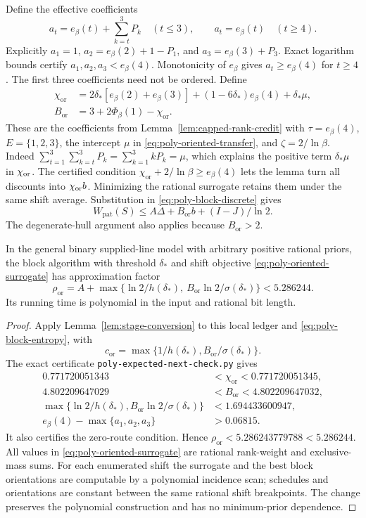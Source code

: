 Define the effective coefficients
\[
 a_t=e_\beta(t)+\sum_{k=t}^{3}P_k\quad(t\le3),\qquad
 a_t=e_\beta(t)\quad(t\ge4).
\]
Explicitly $a_1=1$, $a_2=e_\beta(2)+1-P_1$, and
$a_3=e_\beta(3)+P_3$. Exact logarithm bounds certify
$a_1,a_2,a_3<e_\beta(4)$. Monotonicity of $e_\beta$ gives
$a_t\ge e_\beta(4)$ for $t\ge4$. The first three coefficients need not be ordered. Define
\[
 \begin{aligned}
 \chi_{\mathrm{or}}
 &=2\delta_*[e_\beta(2)+e_\beta(3)]
       +(1-6\delta_*)e_\beta(4)+\delta_*\mu,\\
 B_{\mathrm{or}}&=3+2\Phi_\beta(1)-\chi_{\mathrm{or}}.
 \end{aligned}
\]
These are the coefficients from Lemma~\ref{lem:capped-rank-credit}
with $\tau=e_\beta(4)$, $E=\{1,2,3\}$, the intercept $\mu$ in
\eqref{eq:poly-oriented-transfer}, and $\zeta=2/\ln\beta$.
Indeed $\sum_{t=1}^3\sum_{k=t}^3P_k=\sum_{k=1}^3kP_k=\mu$,
which explains the positive term $\delta_*\mu$ in $\chi_{\rm or}$.
The certified condition
$\chi_{\mathrm{or}}+2/\ln\beta\ge e_\beta(4)$ lets the lemma turn
all discounts into $\chi_{\rm or}b$. Minimizing the rational
surrogate retains them under the same shift average. Substitution in
\eqref{eq:poly-block-discrete} gives
\[
 W_{\mathrm{pat}}(S)\le A\Delta+B_{\mathrm{or}}b+(I-J)/\ln2.
\]
The degenerate-hull argument also applies because $B_{\mathrm{or}}>2$.

\begin{theorem}
\label{thm:poly-oriented-expected}
In the general binary supplied-line model with arbitrary positive
rational priors, the block algorithm with threshold $\delta_*$ and
shift objective \eqref{eq:poly-oriented-surrogate} has approximation
factor
\[
 \boxed{\rho_{\mathrm{or}}=
 A+\max\{\ln2/h(\delta_*),\ B_{\mathrm{or}}\ln2/\sigma(\delta_*)\}
 <5.286244.}
\]
Its running time is polynomial in the input and rational bit length.
\end{theorem}
\begin{proof}
Apply Lemma~\ref{lem:stage-conversion} to this local ledger and
\eqref{eq:poly-block-entropy}, with
\[
 c_{\mathrm{or}}=\max\{1/h(\delta_*),B_{\mathrm{or}}/\sigma(\delta_*)\}.
\]
The exact certificate \texttt{poly-expected-next-check.py} gives
\[
 \begin{aligned}
 0.771720051343&<\chi_{\mathrm{or}}<0.771720051345,\\
 4.802209647029&<B_{\mathrm{or}}<4.802209647032,\\
 \max\{\ln2/h(\delta_*),B_{\mathrm{or}}\ln2/\sigma(\delta_*)\}
 &<1.694433600947,\\
 e_\beta(4)-\max\{a_1,a_2,a_3\}&>0.06815.
 \end{aligned}
\]
It also certifies the zero-route condition. Hence
$\rho_{\mathrm{or}}<5.286243779788<5.286244$.
All values in \eqref{eq:poly-oriented-surrogate} are rational
rank-weight and exclusive-mass sums. For each enumerated shift the
surrogate and the best block orientations are computable by a
polynomial incidence scan; schedules and orientations are constant
between the same rational shift breakpoints. The change preserves the
polynomial construction and has no minimum-prior dependence.
\end{proof}

